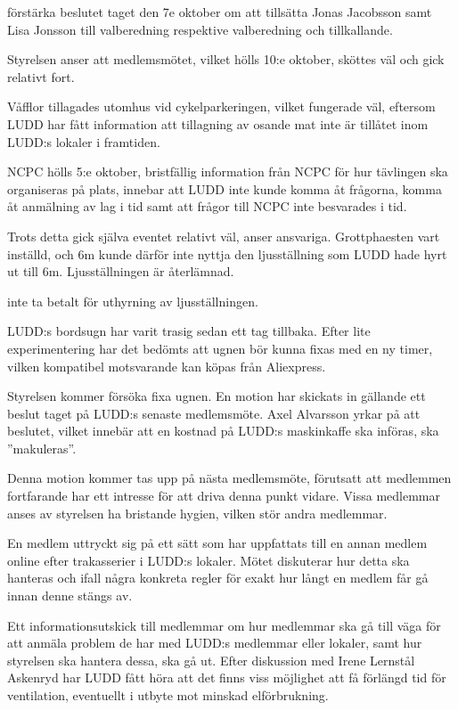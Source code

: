 \documentclass{protokoll}
\begin{document}
\begin{beslut}
  \att förstärka beslutet taget den 7e oktober om att tillsätta Jonas Jacobsson
  samt Lisa Jonsson till valberedning respektive valberedning och tillkallande.
\end{beslut}

Styrelsen anser att medlemsmötet, vilket hölls 10:e oktober, sköttes väl och
gick relativt fort.


Våfflor tillagades utomhus vid cykelparkeringen, vilket fungerade väl, eftersom
LUDD har fått information att tillagning av osande mat inte är tillåtet inom
LUDD:s lokaler i framtiden.

NCPC hölls 5:e oktober, bristfällig information från NCPC för hur tävlingen ska 
organiseras på plats, innebar att LUDD inte kunde komma åt frågorna, komma åt
anmälning av lag i tid samt att frågor till NCPC inte besvarades i tid. 


Trots detta gick själva eventet relativt väl, anser ansvariga.
Grottphaesten vart inställd, och 6m kunde därför inte nyttja den ljusställning
som LUDD hade hyrt ut till 6m. Ljusställningen är återlämnad.


\begin{beslut}
  \att inte ta betalt för uthyrning av ljusställningen.
\end{beslut}

LUDD:s bordsugn har varit trasig sedan ett tag tillbaka. Efter lite
experimentering har det bedömts att ugnen bör kunna fixas med en ny timer,
vilken kompatibel motsvarande kan köpas från Aliexpress. 


Styrelsen kommer försöka fixa ugnen.
En motion har skickats in gällande ett beslut taget på LUDD:s senaste
medlemsmöte. Axel Alvarsson yrkar på att beslutet, vilket innebär att en kostnad
på LUDD:s maskinkaffe ska införas, ska ''makuleras''. 


Denna motion kommer tas upp på nästa medlemsmöte, förutsatt att medlemmen
fortfarande har ett intresse för att driva denna punkt vidare.
Vissa medlemmar anses av styrelsen ha bristande hygien, vilken stör andra 
medlemmar.


En medlem uttryckt sig på ett sätt som har uppfattats till en annan medlem
online efter trakasserier i LUDD:s lokaler. Mötet diskuterar hur detta ska 
hanteras och ifall några konkreta regler för exakt hur långt en medlem får gå 
innan denne stängs av.


Ett informationsutskick till medlemmar om hur medlemmar ska gå till väga för
att anmäla problem de har med LUDD:s medlemmar eller lokaler, samt hur
styrelsen ska hantera dessa, ska gå ut.
Efter diskussion med Irene Lernstål Askenryd har LUDD fått höra att det finns viss
möjlighet att få förlängd tid för ventilation, eventuellt i utbyte mot minskad
elförbrukning. 
\end{document}
